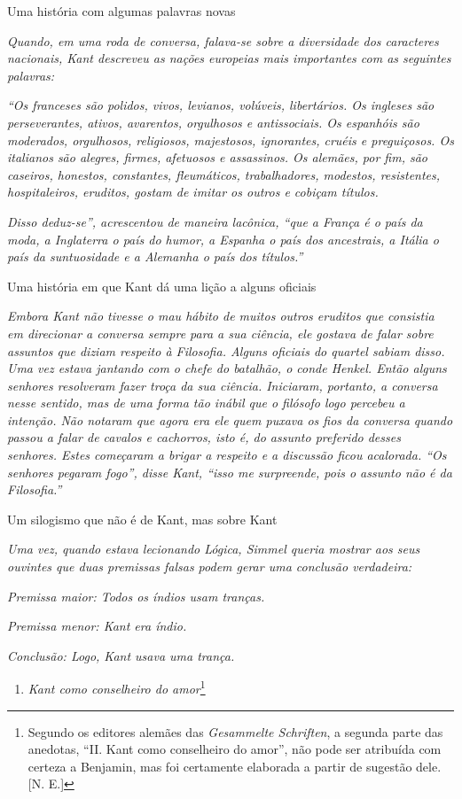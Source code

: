 Uma história com algumas palavras novas

\emph{Quando, em uma roda de conversa, falava-se sobre a diversidade dos
caracteres nacionais, Kant descreveu as nações europeias mais
importantes com as seguintes palavras:}

\emph{``Os franceses são polidos, vivos, levianos, volúveis,
libertários. Os ingleses são perseverantes, ativos, avarentos,
orgulhosos e antissociais. Os espanhóis são moderados, orgulhosos,
religiosos, majestosos, ignorantes, cruéis e preguiçosos. Os italianos
são alegres, firmes, afetuosos e assassinos. Os alemães, por fim, são
caseiros, honestos, constantes, fleumáticos, trabalhadores, modestos,
resistentes, hospitaleiros, eruditos, gostam de imitar os outros e
cobiçam títulos.}

\emph{Disso deduz-se'', acrescentou de maneira lacônica, ``que a França
é o país da moda, a Inglaterra o país do humor, a Espanha o país dos
ancestrais, a Itália o país da suntuosidade e a Alemanha o país dos
títulos.''}

Uma história em que Kant dá uma lição a alguns oficiais

\emph{Embora Kant não tivesse o mau hábito de muitos outros eruditos que
consistia em direcionar a conversa sempre para a sua ciência, ele
gostava de falar sobre assuntos que diziam respeito à Filosofia. Alguns
oficiais do quartel sabiam disso. Uma vez estava jantando com o chefe do
batalhão, o conde Henkel. Então alguns senhores resolveram fazer troça
da sua ciência. Iniciaram, portanto, a conversa nesse sentido, mas de
uma forma tão inábil que o filósofo logo percebeu a intenção. Não
notaram que agora era ele quem puxava os fios da conversa quando passou
a falar de cavalos e cachorros, isto é, do assunto preferido desses
senhores. Estes começaram a brigar a respeito e a discussão ficou
acalorada. ``Os senhores pegaram fogo'', disse Kant, ``isso me
surpreende, pois o assunto não é da Filosofia.''}

Um silogismo que não é de Kant, mas sobre Kant

\emph{Uma vez, quando estava lecionando Lógica, Simmel queria mostrar
aos seus ouvintes que duas premissas falsas podem gerar uma conclusão
verdadeira:}

\emph{Premissa maior: Todos os índios usam tranças.}

\emph{Premissa menor: Kant era índio.}

\emph{Conclusão: Logo, Kant usava uma trança.}

\begin{enumerate}
\def\labelenumi{\Roman{enumi}.}
\item
  \emph{Kant como conselheiro do amor}\footnote{Segundo os editores
    alemães das \emph{Gesammelte Schriften}, a segunda parte das
    anedotas, ``II. Kant como conselheiro do amor'', não pode ser
    atribuída com certeza a Benjamin, mas foi certamente elaborada a
    partir de sugestão dele. [N. E.]}
\end{enumerate}

